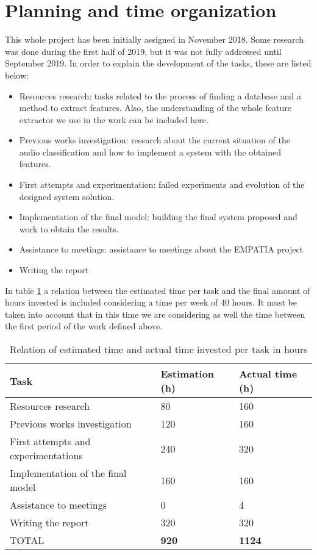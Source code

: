 
\section{Planning and time organization}

	This whole project has been initially assigned in November 2018. Some research was done during the first half of 2019, but it was not fully addressed until September 2019. In order to explain the development of the tasks, these are listed below:
	
	\begin{itemize}
		\item Resources research: tasks related to the process of finding a database and a method to extract features. Also, the understanding of the whole feature extractor we use in the work can be included here.
		\item Previous works investigation: research about the current situation of the audio classification and how to implement a system with the obtained features.
		\item First attempts and experimentation: failed experiments and evolution of the designed system solution.
		\item Implementation of the final model: building the final system proposed and work to obtain the results.
		\item Assistance to meetings: assistance to meetings about the EMPATIA project
		\item Writing the report
	\end{itemize}

	In table \ref{table:14} a relation between the estimated time per task and the final amount of hours invested is included considering a time per week of 40 hours. It must be taken into account that in this time we are considering as well the time between the first period of the work defined above.
	
	\begin{table}[H]
		\begin{center}
			\begin{tabular}{|| m{10em} | m{7em} | m{7em} ||}
				\hline
				\textbf{Task} & \textbf{Estimation (h)} & \textbf{Actual time (h)} \\
				\hline\hline
				Resources research & 80 & 160 \\
				\hline
				Previous works investigation & 120 & 160 \\
				\hline
				First attempts and experimentations & 240 & 320 \\
				\hline
				Implementation of the final model & 160 & 160 \\
				\hline
				Assistance to meetings & 0 & 4 \\
				\hline
				Writing the report & 320 & 320 \\
				\hline
				TOTAL & \textbf{920} & \textbf{1124} \\
				\hline
			\end{tabular}
		\end{center}
		\caption{Relation of estimated time and actual time invested  per task in hours}
		\label{table:14}
	\end{table}


